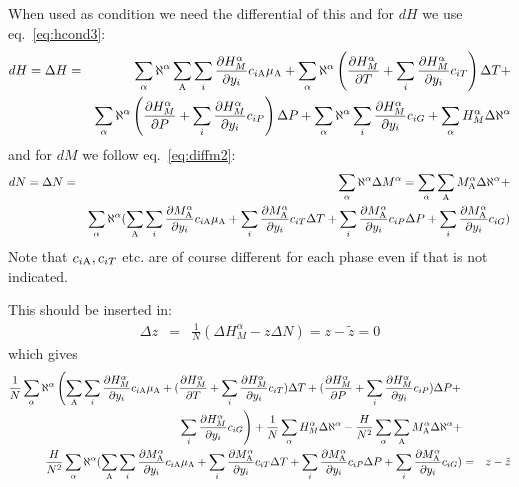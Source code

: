 \documentclass[12pt]{article}
\begin{document}
When used as condition we need the differential of this and for $dH$ we
use eq.~\ref{eq:hcond3}:
\begin{eqnarray}
dH = \Delta H &=& \sum_{\alpha}\aleph^{\alpha}\sum_{\rm A}\sum_i\frac{\partial H^{\alpha}_M}{\partial y_i}c_{i\rm A}\mu_{\rm A}+
\sum_{\alpha}\aleph^{\alpha}\left(\frac{\partial H^{\alpha}_M}{\partial T}+\sum_i\frac{\partial H^{\alpha}_M}{\partial y_i}c_{iT}\right)\Delta T+\nonumber\\&&
\sum_{\alpha}\aleph^{\alpha}\left(\frac{\partial H^{\alpha}_M}{\partial P}+\sum_i\frac{\partial H^{\alpha}_M}{\partial y_i}c_{iP}\right)\Delta P+
\sum_{\alpha}\aleph^{\alpha}\sum_i\frac{\partial H^{\alpha}_M}{\partial y_i}c_{iG}+
\sum_{\alpha}H^{\alpha}_M \Delta \aleph^{\alpha}\nonumber\\
\end{eqnarray}
and for $dM$ we follow eq.~\ref{eq:diffm2}:
\begin{eqnarray}
dN= \Delta N &=& \sum_{\alpha}\aleph^{\alpha}\Delta M^{\alpha}=
\sum_{\alpha}\sum_{\rm A}M^{\alpha}_{\rm A}\Delta\aleph^{\alpha}+\nonumber\\&&
\sum_{\alpha}\aleph^{\alpha}(\sum_{\rm A}\sum_i\frac{\partial M_{\rm A}^{\alpha}}{\partial y_i}c_{i\rm A}\mu_{\rm A}+
\sum_i\frac{\partial M_{\rm A}^{\alpha}}{\partial y_i}c_{iT}\Delta T+
\sum_i\frac{\partial M_{\rm A}^{\alpha}}{\partial y_i}c_{iP}\Delta P+
\sum_i\frac{\partial M_{\rm A}^{\alpha}}{\partial y_i}c_{iG})\nonumber\\
\end{eqnarray}
Note that $c_{i\rm A}, c_{iT}$ etc. are of course different for each
phase even if that is not indicated.

This should be inserted in:
\begin{eqnarray}
\Delta z &=& \frac{1}{N}(\Delta H^{\alpha}_M - z \Delta N) = z-\tilde z = 0
\end{eqnarray}
which gives
\begin{eqnarray}
\frac{1}{N}\sum_{\alpha}\aleph^{\alpha}\left(\sum_{\rm A}\sum_i\frac{\partial H^{\alpha}_M}{\partial y_i}c_{i\rm A}\mu_{\rm A}+
(\frac{\partial H^{\alpha}_M}{\partial T}+\sum_i\frac{\partial H^{\alpha}_M}{\partial y_i}c_{iT})\Delta T+
(\frac{\partial H^{\alpha}_M}{\partial P}+\sum_i\frac{\partial H^{\alpha}_M}{\partial y_i}c_{iP})\Delta P+\right.\nonumber\\
\left.\sum_i\frac{\partial H^{\alpha}_M}{\partial y_i}c_{iG}\right)+
\frac{1}{N}\sum_{\alpha}H^{\alpha}_M \Delta \aleph^{\alpha}-
\frac{H}{N^2}\sum_{\alpha}\sum_{\rm A}M^{\alpha}_{\rm A}\Delta\aleph^{\alpha}+\nonumber\\
\frac{H}{N^2}\sum_{\alpha}\aleph^{\alpha}(\sum_{\rm A}\sum_i\frac{\partial M_{\rm A}^{\alpha}}{\partial y_i}c_{i\rm A}\mu_{\rm A}+
\sum_i\frac{\partial M_{\rm A}^{\alpha}}{\partial y_i}c_{iT}\Delta T+
\sum_i\frac{\partial M_{\rm A}^{\alpha}}{\partial y_i}c_{iP}\Delta P+
\sum_i\frac{\partial M_{\rm A}^{\alpha}}{\partial y_i}c_{iG})&=&z-\tilde z\nonumber\\
\end{eqnarray}
\end{document}
